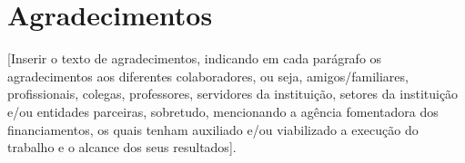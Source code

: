 
\chapter*{Agradecimentos}

[Inserir o texto de agradecimentos, indicando em cada parágrafo os agradecimentos aos diferentes colaboradores, ou seja, amigos/familiares, profissionais, colegas, professores, servidores da instituição, setores da instituição e/ou entidades parceiras, sobretudo, mencionando a agência fomentadora dos financiamentos, os quais tenham auxiliado e/ou viabilizado a execução do trabalho e o alcance dos seus resultados].

\OnesideTwoside{\clearpage}{\cleardoublepage}
